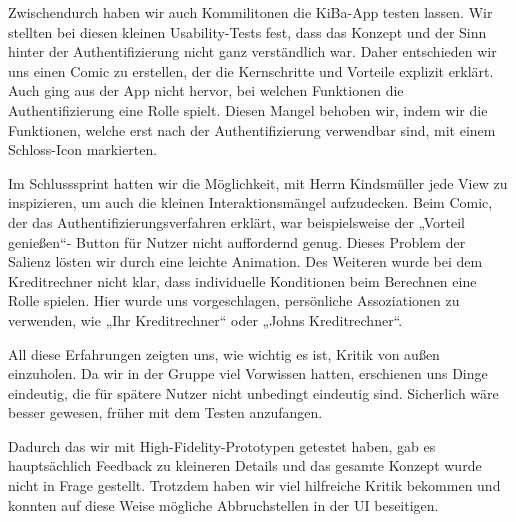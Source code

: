 	Zwischendurch haben wir auch Kommilitonen die KiBa-App testen lassen. Wir stellten bei diesen kleinen Usability-Tests fest, dass das Konzept und der Sinn hinter der Authentifizierung nicht ganz verständlich war. Daher entschieden wir uns einen Comic zu erstellen, der die Kernschritte und Vorteile explizit erklärt. Auch ging aus der App nicht hervor, bei welchen Funktionen die Authentifizierung eine Rolle spielt. Diesen Mangel behoben wir, indem wir die Funktionen, welche erst nach der Authentifizierung verwendbar sind, mit einem Schloss-Icon markierten.
	
	Im Schlusssprint hatten wir die Möglichkeit, mit Herrn Kindsmüller jede View zu inspizieren, um auch die kleinen Interaktionsmängel aufzudecken. Beim Comic, der das Authentifizierungsverfahren erklärt, war beispielsweise der „Vorteil genießen“- Button für Nutzer nicht auffordernd genug. Dieses Problem der Salienz lösten wir durch eine leichte Animation. Des Weiteren wurde bei dem Kreditrechner nicht klar, dass individuelle Konditionen beim Berechnen eine Rolle spielen. Hier wurde uns vorgeschlagen, persönliche Assoziationen zu verwenden, wie „Ihr  Kreditrechner“ oder „Johns Kreditrechner“.

	All diese Erfahrungen zeigten uns, wie wichtig es ist, Kritik von außen einzuholen. Da wir in der Gruppe viel Vorwissen hatten, erschienen uns Dinge eindeutig, die für spätere Nutzer nicht unbedingt eindeutig sind.
Sicherlich wäre besser gewesen, früher mit dem Testen anzufangen.

	Dadurch das wir mit High-Fidelity-Prototypen getestet haben, gab es hauptsächlich Feedback zu kleineren Details und das gesamte Konzept wurde nicht in Frage gestellt. Trotzdem haben wir viel hilfreiche Kritik bekommen und konnten auf diese Weise mögliche Abbruchstellen in der UI beseitigen.
